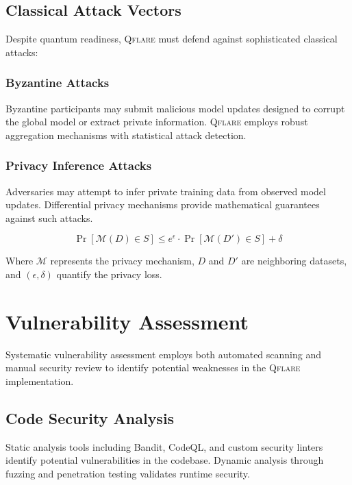 ﻿\documentclass[12pt,a4paper,twoside]{book}
\newcommand{\qflare}{\textsc{Qflare}}
\begin{document}
\subsection{Classical Attack Vectors}
\label{subsec:classical-attacks}

Despite quantum readiness, \qflare{} must defend against sophisticated classical attacks:

\subsubsection{Byzantine Attacks}
Byzantine participants may submit malicious model updates designed to corrupt the global model or extract private information. \qflare{} employs robust aggregation mechanisms with statistical attack detection.

\subsubsection{Privacy Inference Attacks}
Adversaries may attempt to infer private training data from observed model updates. Differential privacy mechanisms provide mathematical guarantees against such attacks.

\begin{equation}
\label{eq:differential-privacy}
\Pr[\mathcal{M}(D) \in S] \leq e^{\epsilon} \cdot \Pr[\mathcal{M}(D') \in S] + \delta
\end{equation}

Where $\mathcal{M}$ represents the privacy mechanism, $D$ and $D'$ are neighboring datasets, and $(\epsilon, \delta)$ quantify the privacy loss.

\section{Vulnerability Assessment}
\label{sec:vulnerability-assessment}

Systematic vulnerability assessment employs both automated scanning and manual security review to identify potential weaknesses in the \qflare{} implementation.

\subsection{Code Security Analysis}
\label{subsec:code-security}

Static analysis tools including Bandit, CodeQL, and custom security linters identify potential vulnerabilities in the codebase. Dynamic analysis through fuzzing and penetration testing validates runtime security.
\end{document}
